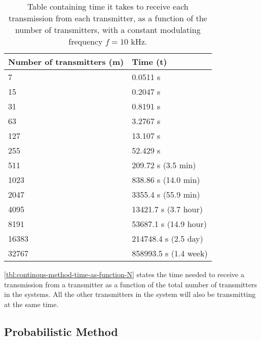 \begin{table}[t]
	\centering
	\begin{tabular}{  | l | l | }

	\hline
	Number of transmitters (m)	& Time (t)					\\ \hline


	7							& 0.0511 s					\\ \hline 
	15							& 0.2047 s					\\ \hline
	31							& 0.8191 s					\\ \hline
	63							& 3.2767 s					\\ \hline
	127							& 13.107 s					\\ \hline
	255							& 52.429 s					\\ \hline
	511							& 209.72 s (3.5 min)		\\ \hline
	1023						& 838.86 s (14.0 min)		\\ \hline
	2047						& 3355.4 s (55.9 min)		\\ \hline
	4095						& 13421.7 s (3.7 hour)		\\ \hline
	8191						& 53687.1 s (14.9 hour)		\\ \hline
	16383						& 214748.4 s (2.5 day)		\\ \hline
	32767						& 858993.5 s (1.4 week)		\\ \hline



\end{tabular}
	\caption{Table containing time it takes to receive each transmission from each transmitter, as a function of the number of transmitters, with a constant modulating frequency $f = 10$ kHz.}
	\label{tbl:continous-method-time-as-function-N}
\end{table}

\autoref{tbl:continous-method-time-as-function-N} states the time needed to receive a transmission from a transmitter as a function of the total number of transmitters in the systems. 
All the other transmitters in the system will also be transmitting at the same time.





\subsection{Probabilistic Method}




